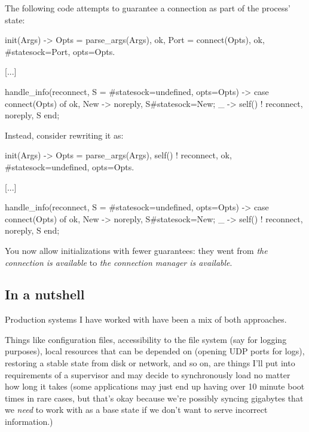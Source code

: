 \documentclass[11pt, oneside]{book}   	%
\begin{document}
The following code attempts to guarantee a connection as part of the process' state:

\begin{VerbatimText}
init(Args) ->
    Opts = parse_args(Args),
    {ok, Port} = connect(Opts),
    {ok, #state{sock=Port, opts=Opts}}.

[...]

handle_info(reconnect, S = #state{sock=undefined, opts=Opts}) ->
    case connect(Opts) of
        {ok, New} -> {noreply, S#state{sock=New}};
         _ -> self() ! reconnect, {noreply, S}
    end;
\end{VerbatimText}

Instead, consider rewriting it as:

\begin{VerbatimText}
init(Args) ->
    Opts = parse_args(Args),
    self() ! reconnect,
    {ok, #state{sock=undefined, opts=Opts}}.

[...]

handle_info(reconnect, S = #state{sock=undefined, opts=Opts}) ->
    case connect(Opts) of
        {ok, New} -> {noreply, S#state{sock=New}};
        _ -> self() ! reconnect, {noreply, S}
    end;
\end{VerbatimText}

You now allow initializations with fewer guarantees: they went from \emph{the connection is available} to \emph{the connection manager is available}.

\subsection{In a nutshell}
\label{subsec:start-link-in-a-nutshell}

Production systems I have worked with have been a mix of both approaches.

Things like configuration files, accessibility to the file system (say for logging purposes), local resources that can be depended on (opening UDP ports for logs), restoring a stable state from disk or network, and so on, are things I'll put into requirements of a supervisor and may decide to synchronously load no matter how long it takes (some applications may just end up having over 10 minute boot times in rare cases, but that's okay because we're possibly syncing gigabytes that we \emph{need} to work with as a base state if we don't want to serve incorrect information.)
\end{document}
